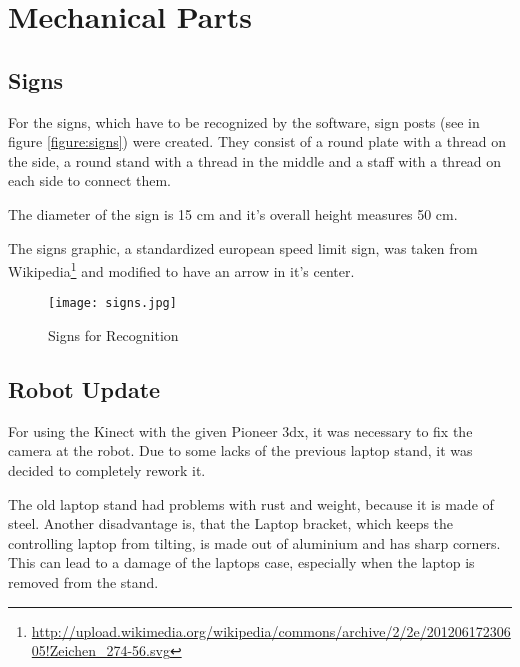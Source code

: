 \chapter{Mechanical Parts}
\graphicspath{{./Mechanical/img/}}



\section{Signs}

For the signs, which have to be recognized by the software, sign posts (see in figure \vref{figure:signs}) were created.
They consist of a round plate with a thread on the side, a round stand with a thread in the middle and a staff
with a thread on each side to connect them.

The diameter of the sign is 15 cm and it's overall height measures 50 cm.

The signs graphic, a standardized european speed limit sign, was taken from\\ 
Wikipedia\footnote{\url{http://upload.wikimedia.org/wikipedia/commons/archive/2/2e/20120617230605!Zeichen_274-56.svg}}
and modified to have an arrow in it's center. 

 \begin{figure}[htp]
\begin{center}
  \texttt{[image: signs.jpg]}
  \caption{Signs for Recognition}
  \label{figure:signs}
\end{center}
\end{figure}

\section{Robot Update}

For using the Kinect with the given Pioneer 3dx, it was necessary to fix the camera at the robot.
Due to some lacks of the previous laptop stand, it was decided to completely rework it.

The old laptop stand had problems with rust and weight,
because it is made of steel. Another disadvantage is, that the Laptop bracket, which keeps the 
controlling laptop from tilting, is made out of aluminium and has sharp corners. This can lead
to a damage of the laptops case, especially when the laptop is removed from the stand. 

